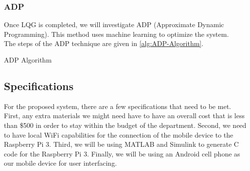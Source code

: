 \documentclass[letterpaper, 10pt, conference]{ieeeconf}
\begin{document}
\subsubsection{ADP}
Once LQG is completed, we will investigate ADP (Approximate Dynamic Programming).  This method uses machine learning to optimize the system.\\
The steps of the ADP technique  are given in \autoref{alg:ADP-Algorithm}. 
\begin{algorithm2e}
\caption{\label{alg:ADP-Algorithm} ADP Algorithm}
\DontPrintSemicolon
{}
\end{algorithm2e}

\subsection{Specifications}
For the proposed system, there are a few specifications that need to be met.  First, any extra materials we might need have to have an overall cost that is less than \$500 in order to stay within the budget of the department.  Second, we need to have local WiFi capabilities for the connection of the mobile device to the Raspberry Pi 3.  Third, we will be using MATLAB and Simulink to generate C code for the Raspberry Pi 3.  Finally, we will be using an Android cell phone as our mobile device for user interfacing.
\end{document}
